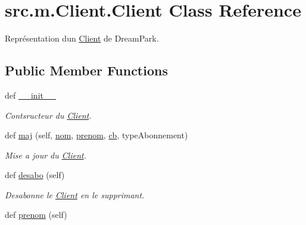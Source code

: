 \hypertarget{classsrc_1_1m_1_1_client_1_1_client}{}\section{src.\+m.\+Client.\+Client Class Reference}
\label{classsrc_1_1m_1_1_client_1_1_client}


Représentation d\textquotesingle{}un \hyperlink{classsrc_1_1m_1_1_client_1_1_client}{Client} de Dream\+Park.  


\subsection*{Public Member Functions}
\begin{DoxyCompactItemize}
\item 
def \hyperlink{classsrc_1_1m_1_1_client_1_1_client_ab4a4ab129850fc66478d759d235ac720}{\+\_\+\+\_\+init\+\_\+\+\_\+}
\begin{DoxyCompactList}\small\item\em Contsructeur du \hyperlink{classsrc_1_1m_1_1_client_1_1_client}{Client}. \end{DoxyCompactList}\item 
def \hyperlink{classsrc_1_1m_1_1_client_1_1_client_a9b403e06df0e0627d38b0e0fb53eb480}{maj} (self, \hyperlink{classsrc_1_1m_1_1_client_1_1_client_a10d8df48e4abae44ec811074ac8c105d}{nom}, \hyperlink{classsrc_1_1m_1_1_client_1_1_client_aad07d815e0ac5eb5c78d4e159592771a}{prenom}, \hyperlink{classsrc_1_1m_1_1_client_1_1_client_a09c74bf7fa3bb680313a9f067211ba0e}{cb}, type\+Abonnement)
\begin{DoxyCompactList}\small\item\em Mise a jour du \hyperlink{classsrc_1_1m_1_1_client_1_1_client}{Client}. \end{DoxyCompactList}\item 
\hypertarget{classsrc_1_1m_1_1_client_1_1_client_a678cfcd8636df25be001d066466afbac}{}def \hyperlink{classsrc_1_1m_1_1_client_1_1_client_a678cfcd8636df25be001d066466afbac}{desabo} (self)\label{classsrc_1_1m_1_1_client_1_1_client_a678cfcd8636df25be001d066466afbac}

\begin{DoxyCompactList}\small\item\em Desabonne le \hyperlink{classsrc_1_1m_1_1_client_1_1_client}{Client} en le supprimant. \end{DoxyCompactList}\item 
\hypertarget{classsrc_1_1m_1_1_client_1_1_client_aad07d815e0ac5eb5c78d4e159592771a}{}def \hyperlink{classsrc_1_1m_1_1_client_1_1_client_aad07d815e0ac5eb5c78d4e159592771a}{prenom} (self)\label{classsrc_1_1m_1_1_client_1_1_client_aad07d815e0ac5eb5c78d4e159592771a}


\end{DoxyCompactItemize}
